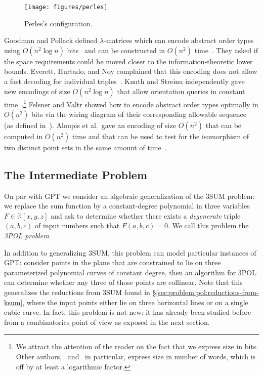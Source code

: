 \begin{figure}
	\centering{}
	\texttt{[image: figures/perles]}
	\caption{Perles's configuration.}\label{fig:perles}
\end{figure}

Goodman and Pollack defined \(\lambda\)-matrices which can encode abstract order
types using \( O(n^2 \log{n}) \) bits~\cite{GP83} and can be constructed in
\(O(n^2)\) time~\cite{EOS86}. They asked if the space
requirements could be moved closer to the information-theoretic lower bounds.
Everett, Hurtado, and Noy complained that this encoding does not
allow a fast decoding for individual triples~\cite{EHN99}.
Knuth and Streinu independently gave new encodings of size \(O(n^2 \log n)\)
that allow orientation queries in constant time~\cite{Knu92,St97}.\footnote{%
We attract the attention of the reader on the fact that we express size in
bits.
Other authors,~\cite{EHN99} and~\cite{St97} in particular,
express size in number of words, which is off by at least a logarithmic factor.}
Felsner and Valtr showed how to encode abstract order types optimally in
\(O(n^2)\) bits via the wiring diagram of their corresponding allowable
sequence~\cite{Fe96, FV11} (as defined in~\cite{Go80}). Aloupis et al.\ gave
an encoding of size \(O(n^2)\) that can be computed in \(O(n^2)\) time and that
can be used to test for the isomorphism of two distinct point sets in the same
amount of time~\cite{AILOW14}.

\subsection{The Intermediate Problem}

On par with GPT we consider an algebraic generalization of the 3SUM problem:
we replace the sum function by a constant-degree polynomial in three variables
$F \in \mathbb{R}[x,y,z]$ and ask to determine whether there exists a
\emph{degenerate} triple $(a,b,c)$ of input numbers such that $F(a,b,c)=0$. We
call this problem the \emph{3POL problem}.
%


In addition to generalizing 3SUM, this problem can model particular
instances of GPT: consider points in the plane that are constrained to
lie on three parameterized polynomial curves of constant degree, then an
algorithm for 3POL can determine whether any three of those points are
collinear. Note that this generalizes the reductions from 3SUM found in
\S\ref{sec:problem:pol:reductions-from-ksum}, where the input points either lie
on three horizontal lines or on a single cubic curve.
%
In fact, this problem is not new: it has already been studied before from a
combinatorics point of view as exposed in the next section.

